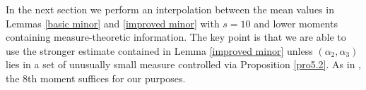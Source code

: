\documentclass{amsart}%
\numberwithin{equation}{section}
\theoremstyle{remark}
\newcommand{\1}{\mathbbm{1}}
\begin{document}


In the next section we perform an interpolation between the mean values in Lemmas \ref{basic minor} and \ref{improved minor} with $s=10$ and lower moments containing measure-theoretic information. The key point is that we are able to use the stronger estimate contained in Lemma \ref{improved minor} unless $(\alpha_2, \alpha_3)$ lies in a set of unusually small measure controlled via Proposition \ref{pro5.2}. As in \cite{ky2026}, the 8th moment suffices for our purposes.

\end{document}
